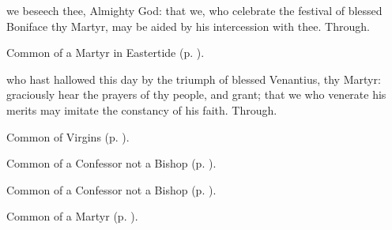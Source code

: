 

\memorialCollect
{} we beseech thee, Almighty God: that we, who celebrate the festival of blessed Boniface thy Martyr, may be aided by his intercession with thee. Through.



\begin{rubric}
	Common of a Martyr in Eastertide (p. \pageref{CommonMartyrEaster}).
\end{rubric}

{} who hast hallowed this day by the triumph of blessed Venantius, thy Martyr: graciously hear the prayers of thy people, and grant; that we who venerate his merits may imitate the constancy of his faith. Through.




\begin{rubric}
	Common of Virgins (p. \pageref{VirginOnlyCollect}).
\end{rubric}


\clearpage
{}

\begin{rubric}
	Common of a Confessor not a Bishop (p. \pageref{AbbotCollect}).
\end{rubric}



\begin{rubric}
	Common of a Confessor not a Bishop (p. \pageref{ConfessorNotBishopCollect}).
\end{rubric}



\begin{rubric}
	Common of a Martyr (p. \pageref{CommonMartyrBishopEasterCollect}).
\end{rubric}


